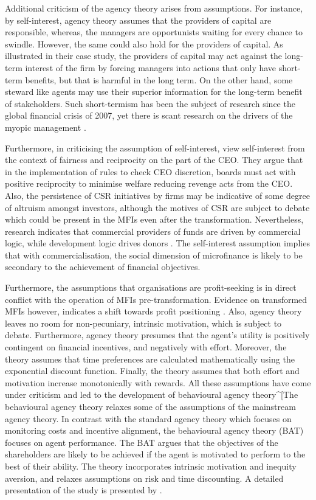 \documentclass[a4paper, nobind]{templates/ociamthesis}
\begin{document}
Additional criticism of the agency theory arises from assumptions. For instance, by self-interest, agency theory assumes that the providers of capital are responsible, whereas, the managers are opportunists waiting for every chance to swindle. However, the same could also hold for the providers of capital. As \textcite{miller2011angel} illustrated in their case study, the providers of capital may act against the long-term interest of the firm by forcing managers into actions that only have short-term benefits, but that is harmful in the long term. On the other hand, some steward like agents may use their superior information for the long-term benefit of stakeholders. Such short-termism has been the subject of research since the global financial crisis of 2007, yet there is scant research on the drivers of the myopic management \autocite{dallas2011short}.

Furthermore, in criticising the assumption of self-interest, \textcite{bosse2016agency} view self-interest from the context of fairness and reciprocity on the part of the CEO. They argue that in the implementation of rules to check CEO discretion, boards must act with positive reciprocity to minimise welfare reducing revenge acts from the CEO. Also, the persistence of CSR initiatives by firms may be indicative of some degree of altruism amongst investors, although the motives of CSR are subject to debate \textcite{glegg2018corporate} which could be present in the MFIs even after the transformation. Nevertheless, research indicates that commercial providers of funds are driven by commercial logic, while development logic drives donors \autocite{cobb2016funding}. The self-interest assumption implies that with commercialisation, the social dimension of microfinance is likely to be secondary to the achievement of financial objectives.

Furthermore, the assumptions that organisations are profit-seeking is in direct conflict with the operation of MFIs pre-transformation. Evidence on transformed MFIs however, indicates a shift towards profit positioning \autocite{chahine2010social,d2017ngos}. Also, agency theory leaves no room for non-pecuniary, intrinsic motivation, which is subject to debate. Furthermore, agency theory presumes that the agent's utility is positively contingent on financial incentives, and negatively with effort. Moreover, the theory assumes that time preferences are calculated mathematically using the exponential discount function. Finally, the theory assumes that both effort and motivation increase monotonically with rewards. All these assumptions have come under criticism and led to the development of behavioural agency theory\^{}{[}The behavioural agency theory relaxes some of the assumptions of the mainstream agency theory. In contrast with the standard agency theory which focuses on monitoring costs and incentive alignment, the behavioural agency theory (BAT) focuses on agent performance. The BAT argues that the objectives of the shareholders are likely to be achieved if the agent is motivated to perform to the best of their ability. The theory incorporates intrinsic motivation and inequity aversion, and relaxes assumptions on risk and time discounting. A detailed presentation of the study is presented by \autocite{pepper2015behavioral}.
\end{document}
